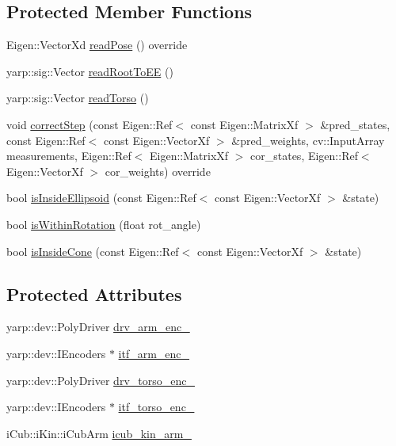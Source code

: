 \subsection*{Protected Member Functions}
\begin{DoxyCompactItemize}
\item 
Eigen\+::\+Vector\+Xd \hyperlink{classiCubGatePose_aff1494edcf8f17803788f954ba0b443b}{read\+Pose} () override
\item 
yarp\+::sig\+::\+Vector \hyperlink{classiCubGatePose_a78b89d0b90d60b37a5f613718d384590}{read\+Root\+To\+EE} ()
\item 
yarp\+::sig\+::\+Vector \hyperlink{classiCubGatePose_ab03607afcf2246d5d1d18835c623fc34}{read\+Torso} ()
\item 
void \hyperlink{classGatePose_a91d395abe75dc7772116f50219dc19ae}{correct\+Step} (const Eigen\+::\+Ref$<$ const Eigen\+::\+Matrix\+Xf $>$ \&pred\+\_\+states, const Eigen\+::\+Ref$<$ const Eigen\+::\+Vector\+Xf $>$ \&pred\+\_\+weights, cv\+::\+Input\+Array measurements, Eigen\+::\+Ref$<$ Eigen\+::\+Matrix\+Xf $>$ cor\+\_\+states, Eigen\+::\+Ref$<$ Eigen\+::\+Vector\+Xf $>$ cor\+\_\+weights) override
\item 
bool \hyperlink{classGatePose_a880273787b1b3542e1e7971954ac118d}{is\+Inside\+Ellipsoid} (const Eigen\+::\+Ref$<$ const Eigen\+::\+Vector\+Xf $>$ \&state)
\item 
bool \hyperlink{classGatePose_a6d188756ed5dcc56c311a2aafc9d1acd}{is\+Within\+Rotation} (float rot\+\_\+angle)
\item 
bool \hyperlink{classGatePose_ad2e8708b3ed5a8252bdec1494f199fda}{is\+Inside\+Cone} (const Eigen\+::\+Ref$<$ const Eigen\+::\+Vector\+Xf $>$ \&state)
\end{DoxyCompactItemize}
\subsection*{Protected Attributes}
\begin{DoxyCompactItemize}
\item 
yarp\+::dev\+::\+Poly\+Driver \hyperlink{classiCubGatePose_ab365d41c45121ee8ec048506f952d252}{drv\+\_\+arm\+\_\+enc\+\_\+}
\item 
yarp\+::dev\+::\+I\+Encoders $\ast$ \hyperlink{classiCubGatePose_ad953e2818c3927e941404522bddf98cb}{itf\+\_\+arm\+\_\+enc\+\_\+}
\item 
yarp\+::dev\+::\+Poly\+Driver \hyperlink{classiCubGatePose_a165a41ce9ec94e024f2aabcfb911ef0b}{drv\+\_\+torso\+\_\+enc\+\_\+}
\item 
yarp\+::dev\+::\+I\+Encoders $\ast$ \hyperlink{classiCubGatePose_abc096becfdfdc97811ed8cfdc13e282c}{itf\+\_\+torso\+\_\+enc\+\_\+}
\item 
i\+Cub\+::i\+Kin\+::i\+Cub\+Arm \hyperlink{classiCubGatePose_aa456e07e3cdbfd4bc1bdf0ed1b56f551}{icub\+\_\+kin\+\_\+arm\+\_\+}
\end{DoxyCompactItemize}

